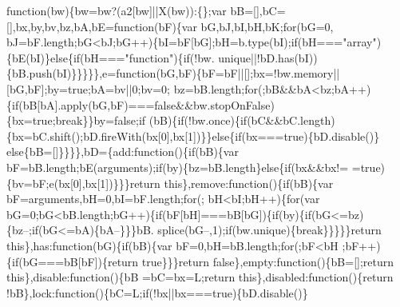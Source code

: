 \begin{DoxyCode}
{      function}(bw)\{bw=bw?(a2[bw]||X(bw)):\{\};var bB=[],bC=[],bx,by,bv,bz,bA,bE=\textcolor{keyword}{function}(bF)\{var bG,bJ,bI,bH,bK;\textcolor{keywordflow}{for}(bG=0,
      bJ=bF.length;bG<bJ;bG++)\{bI=bF[bG];bH=b.type(bI);\textcolor{keywordflow}{if}(bH===\textcolor{stringliteral}{"array"})\{bE(bI)\}\textcolor{keywordflow}{else}\{\textcolor{keywordflow}{if}(bH===\textcolor{stringliteral}{"function"})\{\textcolor{keywordflow}{if}(!bw.
      unique||!bD.has(bI))\{bB.push(bI)\}\}\}\}\},e=\textcolor{keyword}{function}(bG,bF)\{bF=bF||[];bx=!bw.memory||[bG,bF];by=\textcolor{keyword}{true};bA=bv||0;bv=0;
      bz=bB.length;\textcolor{keywordflow}{for}(;bB&&bA<bz;bA++)\{\textcolor{keywordflow}{if}(bB[bA].apply(bG,bF)===\textcolor{keyword}{false}&&bw.stopOnFalse)\{bx=\textcolor{keyword}{true};\textcolor{keywordflow}{break}\}\}by=\textcolor{keyword}{false};\textcolor{keywordflow}{if}
      (bB)\{\textcolor{keywordflow}{if}(!bw.once)\{\textcolor{keywordflow}{if}(bC&&bC.length)\{bx=bC.shift();bD.fireWith(bx[0],bx[1])\}\}\textcolor{keywordflow}{else}\{\textcolor{keywordflow}{if}(bx===\textcolor{keyword}{true})\{bD.disable()\}\textcolor{keywordflow}{
      else}\{bB=[]\}\}\}\},bD=\{add:\textcolor{keyword}{function}()\{\textcolor{keywordflow}{if}(bB)\{var bF=bB.length;bE(arguments);\textcolor{keywordflow}{if}(by)\{bz=bB.length\}\textcolor{keywordflow}{else}\{\textcolor{keywordflow}{if}(bx&&bx!=
      =\textcolor{keyword}{true})\{bv=bF;e(bx[0],bx[1])\}\}\}\textcolor{keywordflow}{return} \textcolor{keyword}{this}\},\textcolor{keyword}{remove}:\textcolor{keyword}{function}()\{\textcolor{keywordflow}{if}(bB)\{var bF=arguments,bH=0,bI=bF.length;\textcolor{keywordflow}{for}(;
      bH<bI;bH++)\{\textcolor{keywordflow}{for}(var bG=0;bG<bB.length;bG++)\{\textcolor{keywordflow}{if}(bF[bH]===bB[bG])\{\textcolor{keywordflow}{if}(by)\{\textcolor{keywordflow}{if}(bG<=bz)\{bz--;\textcolor{keywordflow}{if}(bG<=bA)\{bA--\}\}\}bB.
      splice(bG--,1);\textcolor{keywordflow}{if}(bw.unique)\{\textcolor{keywordflow}{break}\}\}\}\}\}\textcolor{keywordflow}{return} \textcolor{keyword}{this}\},has:\textcolor{keyword}{function}(bG)\{\textcolor{keywordflow}{if}(bB)\{var bF=0,bH=bB.length;\textcolor{keywordflow}{for}(;bF<bH
      ;bF++)\{\textcolor{keywordflow}{if}(bG===bB[bF])\{\textcolor{keywordflow}{return} \textcolor{keyword}{true}\}\}\}\textcolor{keywordflow}{return} \textcolor{keyword}{false}\},empty:\textcolor{keyword}{function}()\{bB=[];\textcolor{keywordflow}{return} \textcolor{keyword}{this}\},disable:\textcolor{keyword}{function}()\{bB
      =bC=bx=L;\textcolor{keywordflow}{return} \textcolor{keyword}{this}\},disabled:\textcolor{keyword}{function}()\{\textcolor{keywordflow}{return} !bB\},lock:\textcolor{keyword}{function}()\{bC=L;\textcolor{keywordflow}{if}(!bx||bx===\textcolor{keyword}{true})\{bD.disable()\}\textcolor{keywordflow}{
}
\end{DoxyCode}
